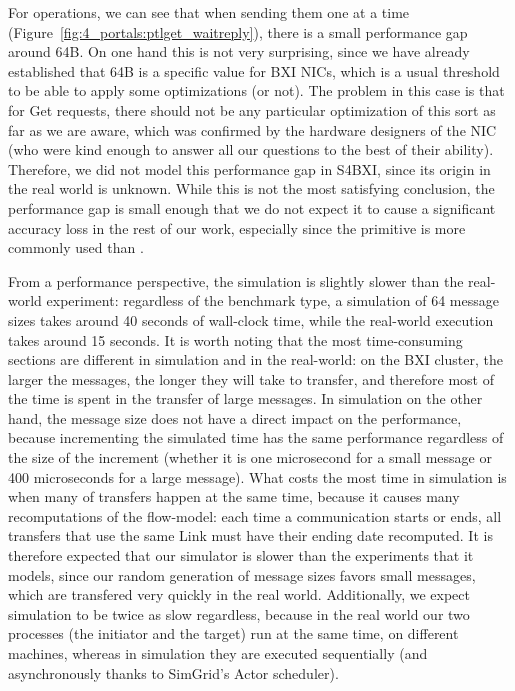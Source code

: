For  operations, we can see that when sending them one at a time
(Figure~\ref{fig:4_portals:ptlget_waitreply}), there is a small performance gap
around 64B. On one hand this is not very surprising, since we have already
established that 64B is a specific value for BXI NICs, which is a usual
threshold to be able to apply some optimizations (or not). The problem in this
case is that for Get requests, there should not be any particular optimization
of this sort as far as we are aware, which was confirmed by the hardware
designers of the NIC (who were kind enough to answer all our questions to the
best of their ability). Therefore, we did not model this performance gap in
S4BXI, since its origin in the real world is unknown. While this is not the most
satisfying conclusion, the performance gap is small enough that we do not expect
it to cause a significant accuracy loss in the rest of our work, especially
since the  primitive is more commonly used than .

From a performance perspective, the simulation is slightly slower than the
real-world experiment: regardless of the benchmark type, a simulation of 64
message sizes takes around 40 seconds of wall-clock time, while the real-world
execution takes around 15 seconds. It is worth noting that the most
time-consuming sections are different in simulation and in the real-world: on
the BXI cluster, the larger the messages, the longer they will take to transfer,
and therefore most of the time is spent in the transfer of large messages. In
simulation on the other hand, the message size does not have a direct impact on
the performance, because incrementing the simulated time has the same
performance regardless of the size of the increment (whether it is one
microsecond for a small message or 400 microseconds for a large message). What
costs the most time in simulation is when many of transfers happen at the same
time, because it causes many recomputations of the flow-model: each time a
communication starts or ends, all transfers that use the same Link must have
their ending date recomputed. It is therefore expected that our simulator is
slower than the experiments that it models, since our random generation of
message sizes favors small messages, which are transfered very quickly in the
real world. Additionally, we expect simulation to be twice as slow regardless,
because in the real world our two processes (the initiator and the target) run
at the same time, on different machines, whereas in simulation they are executed
sequentially (and asynchronously thanks to SimGrid's Actor scheduler).

